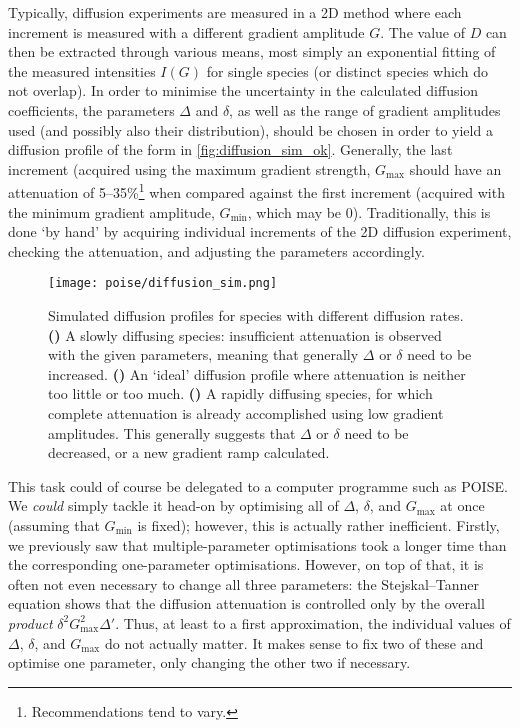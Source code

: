 Typically, diffusion experiments are measured in a 2D method where each increment is measured with a different gradient amplitude $G$.
The value of $D$ can then be extracted through various means, most simply an exponential fitting of the measured intensities $I(G)$ for single species (or distinct species which do not overlap).
In order to minimise the uncertainty in the calculated diffusion coefficients, the parameters $\Delta$ and $\delta$, as well as the range of gradient amplitudes used (and possibly also their distribution), should be chosen in order to yield a diffusion profile of the form in \cref{fig:diffusion_sim_ok}.
Generally, the last increment (acquired using the maximum gradient strength, $G_\text{max}$ should have an attenuation of 5--35\%\footnote{Recommendations tend to vary.} when compared against the first increment (acquired with the minimum gradient amplitude, $G_\text{min}$, which may be 0).
Traditionally, this is done `by hand' by acquiring individual increments of the 2D diffusion experiment, checking the attenuation, and adjusting the parameters accordingly.\autocite{Johnson1999PNMRS,Claridge2016}

\begin{figure}[htb]
    \centering
    \texttt{[image: poise/diffusion\_sim.png]}%
    {\label{fig:diffusion_sim_weak}}%
    {\label{fig:diffusion_sim_ok}}%
    {\label{fig:diffusion_sim_strong}}%
    \caption[Simulated diffusion profiles for slow, intermediate, and rapid diffusion]{
        Simulated diffusion profiles for species with different diffusion rates.
        \textbf{()} A slowly diffusing species: insufficient attenuation is observed with the given parameters, meaning that generally $\Delta$ or $\delta$ need to be increased.
        \textbf{()} An `ideal' diffusion profile where attenuation is neither too little or too much.
        \textbf{()} A rapidly diffusing species, for which complete attenuation is already accomplished using low gradient amplitudes. This generally suggests that $\Delta$ or $\delta$ need to be decreased, or a new gradient ramp calculated.
    }
    \label{fig:diffusion_sim}
\end{figure}

This task could of course be delegated to a computer programme such as POISE.
We \textit{could} simply tackle it head-on by optimising all of $\Delta$, $\delta$, and $G_\text{max}$ at once (assuming that $G_\text{min}$ is fixed); however, this is actually rather inefficient.
Firstly, we previously saw that multiple-parameter optimisations took a longer time than the corresponding one-parameter optimisations.
However, on top of that, it is often not even necessary to change all three parameters: the Stejskal--Tanner equation shows that the diffusion attenuation is controlled only by the overall \textit{product} $\delta^2 G_\text{max}^2 \Delta'$.
Thus, at least to a first approximation, the individual values of $\Delta$, $\delta$, and $G_\text{max}$ do not actually matter.
It makes sense to fix two of these and optimise one parameter, only changing the other two if necessary.

